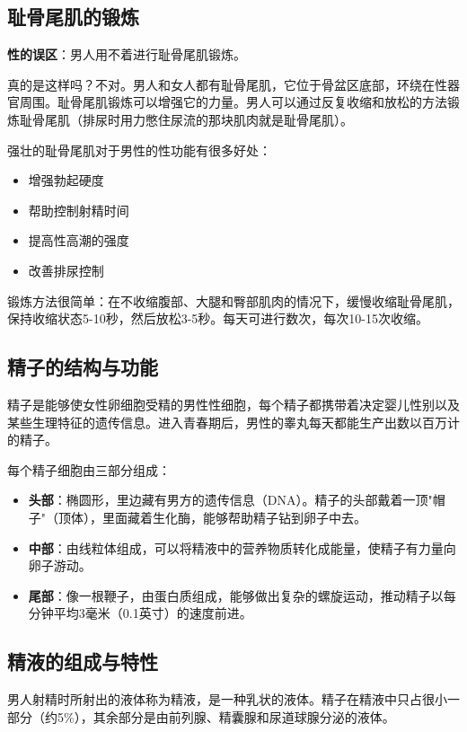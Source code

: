 \subsection{耻骨尾肌的锻炼}

\textbf{性的误区}：男人用不着进行耻骨尾肌锻炼。

真的是这样吗？不对。男人和女人都有耻骨尾肌，它位于骨盆区底部，环绕在性器官周围。耻骨尾肌锻炼可以增强它的力量。男人可以通过反复收缩和放松的方法锻炼耻骨尾肌（排尿时用力憋住尿流的那块肌肉就是耻骨尾肌）。

强壮的耻骨尾肌对于男性的性功能有很多好处：
\begin{itemize}
    \item 增强勃起硬度
    \item 帮助控制射精时间
    \item 提高性高潮的强度
    \item 改善排尿控制
\end{itemize}

锻炼方法很简单：在不收缩腹部、大腿和臀部肌肉的情况下，缓慢收缩耻骨尾肌，保持收缩状态5-10秒，然后放松3-5秒。每天可进行数次，每次10-15次收缩。

\subsection{精子的结构与功能}

精子是能够使女性卵细胞受精的男性性细胞，每个精子都携带着决定婴儿性别以及某些生理特征的遗传信息。进入青春期后，男性的睾丸每天都能生产出数以百万计的精子。

每个精子细胞由三部分组成：

\begin{itemize}
    \item \textbf{头部}：椭圆形，里边藏有男方的遗传信息（DNA）。精子的头部戴着一顶"帽子"（顶体），里面藏着生化酶，能够帮助精子钻到卵子中去。
    \item \textbf{中部}：由线粒体组成，可以将精液中的营养物质转化成能量，使精子有力量向卵子游动。
    \item \textbf{尾部}：像一根鞭子，由蛋白质组成，能够做出复杂的螺旋运动，推动精子以每分钟平均3毫米（0.1英寸）的速度前进。
\end{itemize}

\subsection{精液的组成与特性}

男人射精时所射出的液体称为精液，是一种乳状的液体。精子在精液中只占很小一部分（约5\%），其余部分是由前列腺、精囊腺和尿道球腺分泌的液体。

